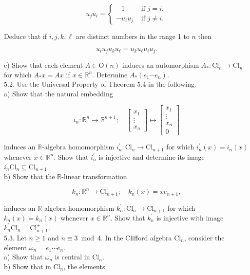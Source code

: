 \documentclass[10pt, letterpaper]{article}
\begin{document}
$$
u_{j} u_{i}= \begin{cases}-1 & \text { if } j=i, \\ -u_{i} u_{j} & \text { if } j \neq i .\end{cases}
$$

Deduce that if $i, j, k, \ell$ are distinct numbers in the range 1 to $n$ then

$$
u_{i} u_{j} u_{k} u_{\ell}=u_{k} u_{\ell} u_{i} u_{j} .
$$

c) Show that each element $A \in \mathrm{O}(n)$ induces an automorphism $A_{*}: \mathrm{Cl}_{n} \longrightarrow \mathrm{Cl}_{n}$ for which $A_{*} x=A x$ if $x \in \mathbb{R}^{n}$. Determine $A_{*}\left(e_{1} \cdots e_{n}\right)$.\\
5.2. Use the Universal Property of Theorem 5.4 in the following.\\
a) Show that the natural embedding

$$
i_{n}: \mathbb{R}^{n} \longrightarrow \mathbb{R}^{n+1} ; \quad\left[\begin{array}{c}
x_{1} \\
\vdots \\
x_{n}
\end{array}\right] \longmapsto\left[\begin{array}{c}
x_{1} \\
\vdots \\
x_{n} \\
0
\end{array}\right]
$$

induces an $\mathbb{R}$-algebra homomorphism $i_{n}^{\prime}: \mathrm{Cl}_{n} \longrightarrow \mathrm{Cl}_{n+1}$ for which $i_{n}^{\prime}(x)=i_{n}(x)$ whenever $x \in \mathbb{R}^{n}$. Show that $i_{n}^{\prime}$ is injective and determine its image $i_{n}^{\prime} \mathrm{Cl}_{n} \subseteq \mathrm{Cl}_{n+1}$.\\
b) Show that the $\mathbb{R}$-linear transformation

$$
k_{n}: \mathbb{R}^{n} \longrightarrow \mathrm{Cl}_{n+1} ; \quad k_{n}(x)=x e_{n+1},
$$

induces an $\mathbb{R}$-algebra homomorphism $k_{n}^{\prime}: \mathrm{Cl}_{n} \longrightarrow \mathrm{Cl}_{n+1}$ for which $k_{n}^{\prime}(x)=k_{n}(x)$ whenever $x \in \mathbb{R}^{n}$. Show that $k_{n}^{\prime}$ is injective with image $k_{n}^{\prime} \mathrm{Cl}_{n}=\mathrm{Cl}_{n+1}^{+}$.\\
5.3. Let $n \geqslant 1$ and $n \equiv 3 \bmod 4$. In the Clifford algebra $\mathrm{Cl}_{n}$, consider the element $\omega_{n}=e_{1} \cdots e_{n}$.\\
a) Show that $\omega_{n}$ is central in $\mathrm{Cl}_{n}$.\\
b) Show that in $\mathrm{Cl}_{n}$, the elements
\end{document}
